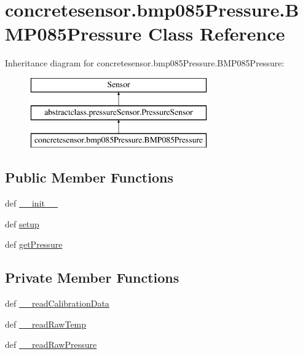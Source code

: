 \hypertarget{classconcretesensor_1_1bmp085Pressure_1_1BMP085Pressure}{}\section{concretesensor.\+bmp085\+Pressure.\+B\+M\+P085\+Pressure Class Reference}
\label{classconcretesensor_1_1bmp085Pressure_1_1BMP085Pressure}
Inheritance diagram for concretesensor.\+bmp085\+Pressure.\+B\+M\+P085\+Pressure\+:\begin{figure}[H]
\begin{center}
\leavevmode
\includegraphics[height=3.000000cm]{classconcretesensor_1_1bmp085Pressure_1_1BMP085Pressure}
\end{center}
\end{figure}
\subsection*{Public Member Functions}
\begin{DoxyCompactItemize}
\item 
def \hyperlink{classconcretesensor_1_1bmp085Pressure_1_1BMP085Pressure_a9c69f21483c8376699a77649364f905d}{\+\_\+\+\_\+init\+\_\+\+\_\+}
\item 
def \hyperlink{classconcretesensor_1_1bmp085Pressure_1_1BMP085Pressure_aa9f9873e1541ab02df459543d0f71c76}{setup}
\item 
def \hyperlink{classconcretesensor_1_1bmp085Pressure_1_1BMP085Pressure_a2b5fce53c77a381ccab456a8280fd588}{get\+Pressure}
\end{DoxyCompactItemize}
\subsection*{Private Member Functions}
\begin{DoxyCompactItemize}
\item 
def \hyperlink{classconcretesensor_1_1bmp085Pressure_1_1BMP085Pressure_aa90de460b8fa125b417acc032316a203}{\+\_\+\+\_\+read\+Calibration\+Data}
\item 
def \hyperlink{classconcretesensor_1_1bmp085Pressure_1_1BMP085Pressure_a664fcdca852f668683af2553a3b5d107}{\+\_\+\+\_\+read\+Raw\+Temp}
\item 
def \hyperlink{classconcretesensor_1_1bmp085Pressure_1_1BMP085Pressure_a624588255400c54841b667a72dbad16c}{\+\_\+\+\_\+read\+Raw\+Pressure}
\end{DoxyCompactItemize}
